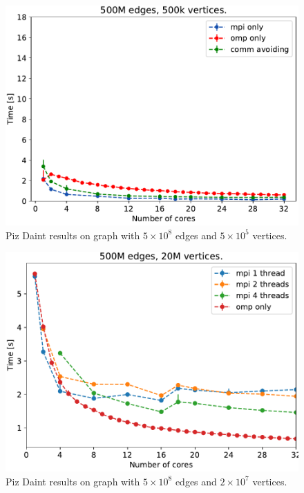
\begin{figure}[H]
\includegraphics[width=\fsize]{data/plot_vertices_500k}
\caption{Piz Daint results on graph with $5\times10^8$ edges and $5\times10^5$ vertices.}
\label{fig:mpi_omp_commavoiding_daint_1}
\end{figure}

\begin{figure}
\includegraphics[width=\fsize]{data/all_vertices_without_commavoid_20M.pdf}
\caption{Piz Daint results on graph with $5\times10^8$ edges and $2\times10^7$ vertices.}
\label{fig:mixed_daint}
\end{figure}

